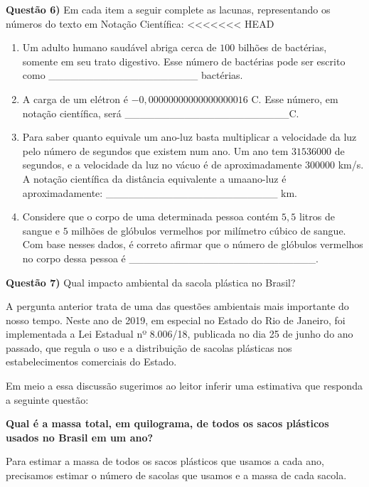 \textbf{Questão 6)} Em cada item a seguir complete as lacunas, representando os números do texto em Notação Científica:
\textless{}\textless{}\textless{}\textless{}\textless{}\textless{}\textless{} HEAD
\begin{enumerate}
\item {} 
Um adulto humano saudável abriga cerca de \(100\) bilhões de bactérias, somente em seu trato digestivo. Esse número de bactérias pode ser escrito como \_\_\_\_\_\_\_\_\_\_\_\_\_\_\_\_\_\_\_\_ bactérias.

\item {} 
A carga de um elétron é \(-0,00000000000000000016\) C. Esse número, em notação científica, será \_\_\_\_\_\_\_\_\_\_\_\_\_\_\_\_\_\_\_\_\_\_C.

\item {} 
Para saber quanto equivale um ano-luz basta multiplicar a velocidade da luz pelo número de segundos que existem num ano. Um ano tem \(31 536 000\) de segundos, e a velocidade da luz no vácuo é de aproximadamente \(300 000\) km/s. A notação científica da distância equivalente a umaano-luz é aproximadamente:  \_\_\_\_\_\_\_\_\_\_\_\_\_\_\_\_\_\_\_\_\_\_\_ km.

\item {} 
Considere que o corpo de uma determinada pessoa contém \(5,5\) litros de sangue e \(5\) milhões de glóbulos vermelhos por milímetro cúbico de sangue. Com base nesses dados, é correto afirmar que o número de glóbulos vermelhos no corpo dessa pessoa é \_\_\_\_\_\_\_\_\_\_\_\_\_\_\_\_\_\_\_\_\_\_\_\_\_.

\end{enumerate}

\textbf{Questão 7)} Qual impacto ambiental da sacola plástica no Brasil?

A pergunta anterior trata de uma das questões ambientais mais importante do nosso tempo. Neste ano de 2019, em especial no Estado do Rio de Janeiro, foi implementada a Lei Estadual nº 8.006/18, publicada no dia 25 de junho do ano passado, que regula o uso e a distribuição de sacolas plásticas nos estabelecimentos comerciais do Estado.

Em meio a essa discussão sugerimos ao leitor inferir uma estimativa que responda a seguinte questão:

\textbf{Qual é a massa total, em quilograma, de todos os sacos plásticos usados no Brasil em um ano?}

Para estimar a massa de todos os sacos plásticos que usamos a cada ano, precisamos estimar o número de sacolas que usamos e a massa de cada sacola.

